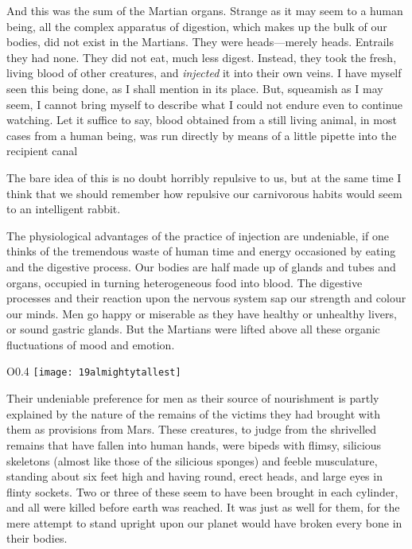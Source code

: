 And this was the sum of the Martian organs. Strange as it may seem to a human being, all the complex apparatus of digestion, which makes up the bulk of our bodies, did not exist in the Martians. They were heads—merely heads. Entrails they had none. They did not eat, much less digest. Instead, they took the fresh, living blood of other creatures, and \textit{injected} it into their own veins. I have myself seen this being done, as I shall mention in its place. But, squeamish as I may seem, I cannot bring myself to describe what I could not endure even to continue watching. Let it suffice to say, blood obtained from a still living animal, in most cases from a human being, was run directly by means of a little pipette into the recipient canal\textellipsis

The bare idea of this is no doubt horribly repulsive to us, but at the same time I think that we should remember how repulsive our carnivorous habits would seem to an intelligent rabbit.

The physiological advantages of the practice of injection are undeniable, if one thinks of the tremendous waste of human time and energy occasioned by eating and the digestive process. Our bodies are half made up of glands and tubes and organs, occupied in turning heterogeneous food into blood. The digestive processes and their reaction upon the nervous system sap our strength and colour our minds. Men go happy or miserable as they have healthy or unhealthy livers, or sound gastric glands. But the Martians were lifted above all these organic fluctuations of mood and emotion.

\begin{wrapfigure}{O}{0.4\textwidth}
\centering
\texttt{[image: 19almightytallest]}
\end{wrapfigure}

Their undeniable preference for men as their source of nourishment is partly explained by the nature of the remains of the victims they had brought with them as provisions from Mars. These creatures, to judge from the shrivelled remains that have fallen into human hands, were bipeds with flimsy, silicious skeletons (almost like those of the silicious sponges) and feeble musculature, standing about six feet high and having round, erect heads, and large eyes in flinty sockets. Two or three of these seem to have been brought in each cylinder, and all were killed before earth was reached. It was just as well for them, for the mere attempt to stand upright upon our planet would have broken every bone in their bodies.

